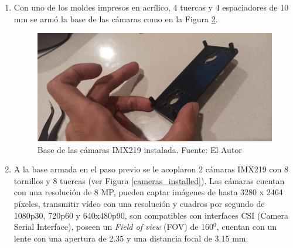 \begin{enumerate}
\begin{figure}[H]
        \label{stereoPi_IO}
    \end{figure}
    \item Con uno de los moldes impresos en acrílico, 4 tuercas y 4 espaciadores de 10 mm se armó la base de las cámaras como en la Figura \ref{camera_base}.
    \begin{figure}[H]
        \centering
        \includegraphics[scale=0.05]{Recursos/camera_base.jpg}
        \caption[Base de las cámaras IMX219 instalada.]{Base de las cámaras IMX219 instalada. {\footnotesize Fuente: El Autor}}
        \label{camera_base}
    \end{figure}
    \item A la base armada en el paso previo se le acoplaron 2 cámaras IMX219 con 8 tornillos y 8 tuercas (ver Figura \ref{cameras_installed}). Las cámaras cuentan con una resolución de 8 MP, pueden captar imágenes de hasta 3280 x 2464 píxeles, transmitir vídeo con una resolución y cuadros por segundo de 1080p30, 720p60 y 640x480p90, son compatibles con interfaces CSI (Camera Serial Interface), poseen un \textit{Field of view} (FOV) de 160$^0$, cuentan con un lente con una apertura de 2.35 y una distancia focal de 3.15 mm.
    \begin{figure}[H]
        \centering

\end{figure}
\end{enumerate}
